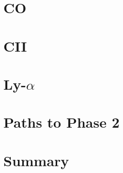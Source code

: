 \documentclass{PoS}
\begin{document}
\section{CO}


\section{CII}


\section{Ly-$\alpha$}


\section{Paths to Phase 2}

\section{Summary}




{}
\end{document}
